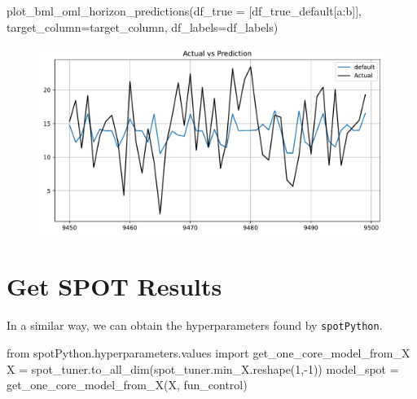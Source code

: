 \documentclass[
  letterpaper,
  DIV=11,
  numbers=noendperiod]{scrreprt}
\newenvironment{Shaded}{\begin{snugshade}}{\end{snugshade}}
\newcommand{\DecValTok}[1]{\textcolor[rgb]{0.68,0.00,0.00}{#1}}
\newcommand{\ImportTok}[1]{\textcolor[rgb]{0.00,0.46,0.62}{#1}}
\newcommand{\NormalTok}[1]{\textcolor[rgb]{0.00,0.23,0.31}{#1}}
\newcommand{\OperatorTok}[1]{\textcolor[rgb]{0.37,0.37,0.37}{#1}}
\begin{document}
\begin{Shaded}
\begin{Highlighting}[]
\NormalTok{plot\_bml\_oml\_horizon\_predictions(df\_true }\OperatorTok{=}\NormalTok{ [df\_true\_default[a:b]], target\_column}\OperatorTok{=}\NormalTok{target\_column,  df\_labels}\OperatorTok{=}\NormalTok{df\_labels)}
\end{Highlighting}
\end{Shaded}

\begin{figure}[H]

{\centering \includegraphics{024_spot_hpt_river_friedman_hatr_files/figure-pdf/cell-31-output-1.pdf}

}

\end{figure}

\hypertarget{get-spot-results-5}{%
\section{Get SPOT Results}\label{get-spot-results-5}}

In a similar way, we can obtain the hyperparameters found by
\texttt{spotPython}.

\begin{Shaded}
\begin{Highlighting}[]
\ImportTok{from}\NormalTok{ spotPython.hyperparameters.values }\ImportTok{import}\NormalTok{ get\_one\_core\_model\_from\_X}
\NormalTok{X }\OperatorTok{=}\NormalTok{ spot\_tuner.to\_all\_dim(spot\_tuner.min\_X.reshape(}\DecValTok{1}\NormalTok{,}\OperatorTok{{-}}\DecValTok{1}\NormalTok{))}
\NormalTok{model\_spot }\OperatorTok{=}\NormalTok{ get\_one\_core\_model\_from\_X(X, fun\_control)}
\end{Highlighting}
\end{Shaded}
\end{document}
